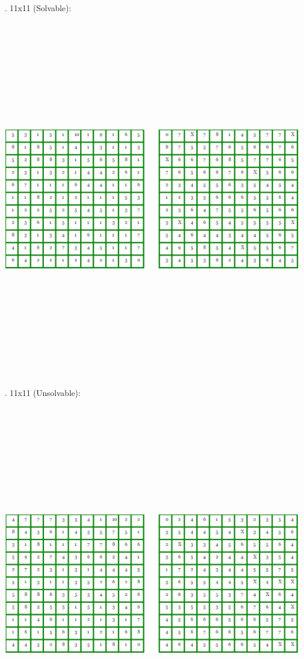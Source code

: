 \documentclass[12pt, letterpaper]{article}
\begin{document}
\bigskip
{}. 11x11 (Solvable):
	
	
{\centering
	\includegraphics[width=16cm, height=16cm, keepaspectratio]{"Task 2/11x11 Puzzle (Solvable)"}
\par}

\bigskip
{}. 11x11 (Unsolvable):
	
{\centering
	\includegraphics[width=16cm, height=16cm, keepaspectratio]{"Task 2/11x11 Puzzle (Unsolvable)"}
\par}
\end{document}
